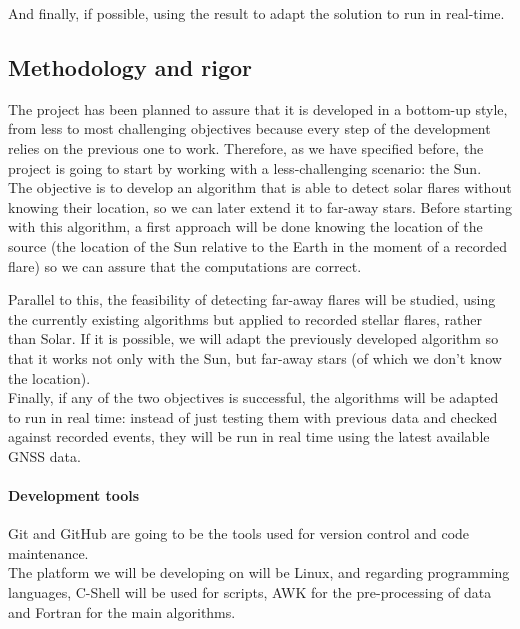 And finally, if possible, using the result to adapt the solution to run in real-time.

\subsection{Methodology and rigor}

The project has been planned to assure that it is developed in a bottom-up style, from less to most challenging objectives because every step of the development relies on the previous one to work. Therefore, as we have specified before, the project is going to start by working with a less-challenging scenario: the Sun.\\

The objective is to develop an algorithm that is able to detect solar flares without knowing their location, so we can later extend it to far-away stars. Before starting with this algorithm, a first approach will be done knowing the location of the source (the location of the Sun relative to the Earth in the moment of a recorded flare) so we can assure that the computations are correct.

Parallel to this, the feasibility of detecting far-away flares will be studied, using the currently existing algorithms \cite{hernandez2012gnss} but applied to recorded stellar flares, rather than Solar. If it is possible, we will adapt the previously developed algorithm so that it works not only with the Sun, but far-away stars (of which we don't know the location).\\

Finally, if any of the two objectives is successful, the algorithms will be adapted to run in real time: instead of just testing them with previous data and checked against recorded events, they will be run in real time using the latest available GNSS data.

\paragraph{Development tools}

Git and GitHub are going to be the tools used for version control and code maintenance.\\

The platform we will be developing on will be Linux, and regarding programming languages, C-Shell will be used for scripts, AWK for the pre-processing of data and Fortran for the main algorithms. \\

